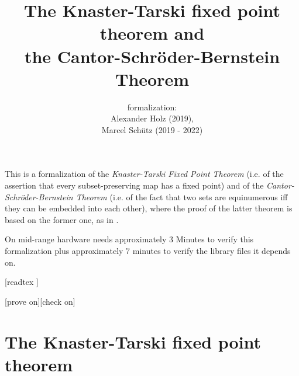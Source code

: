 \documentclass{article}
\title{The Knaster-Tarski fixed point theorem and \\
the Cantor-Schröder-Bernstein Theorem}
\author{\Naproche formalization: \vspace{0.5em} \\
Alexander Holz (2019), \\
Marcel Schütz (2019 - 2022)}
\date{}
\begin{document}
  \maketitle

  \noindent This is a formalization of the \textit{Knaster-Tarski Fixed Point
  Theorem} (i.e. of the assertion that every subset-preserving map has a fixed
  point) and of the \textit{Cantor-Schröder-Bernstein Theorem} (i.e. of the
  fact that two sets are equinumerous iff they can be embedded into each other),
  where the proof of the latter theorem is based on the former one, as in
  \cite[p. 530]{Schroeder2012}.

  On mid-range hardware \Naproche needs approximately 3 Minutes to verify this
  formalization plus approximately 7 minutes to verify the library files it
  depends on.

  \begin{forthel}

    [readtex ]

    [prove on][check on]
  \end{forthel}


  \section*{The Knaster-Tarski fixed point theorem}
\end{document}
